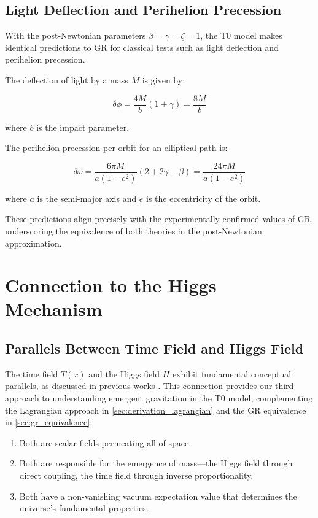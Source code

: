 \documentclass[12pt,a4paper]{article}
\newcommand{\Tfield}{T(x)}
\begin{document}
	\subsection{Light Deflection and Perihelion Precession}
	With the post-Newtonian parameters \(\beta = \gamma = \zeta = 1\), the T0 model makes identical predictions to GR for classical tests such as light deflection and perihelion precession.
	
	The deflection of light by a mass \(M\) is given by:
	
	\begin{equation}
		\delta\phi = \frac{4M}{b}(1 + \gamma) = \frac{8M}{b}
	\end{equation}
	
	where \(b\) is the impact parameter.
	
	The perihelion precession per orbit for an elliptical path is:
	
	\begin{equation}
		\delta\omega = \frac{6\pi M}{a(1-e^2)}(2 + 2\gamma - \beta) = \frac{24\pi M}{a(1-e^2)}
	\end{equation}
	
	where \(a\) is the semi-major axis and \(e\) is the eccentricity of the orbit.
	
	These predictions align precisely with the experimentally confirmed values of GR, underscoring the equivalence of both theories in the post-Newtonian approximation.
	
	\section{Connection to the Higgs Mechanism}
	\label{sec:higgs_connection}
	
	\subsection{Parallels Between Time Field and Higgs Field}
	\label{subsec:higgs_parallels}
	The time field \(\Tfield\) and the Higgs field \(H\) exhibit fundamental conceptual parallels, as discussed in previous works \cite{pascher_higgs_2025,pascher_alpha_2025,pascher_alphabeta_2025}. This connection provides our third approach to understanding emergent gravitation in the T0 model, complementing the Lagrangian approach in \cref{sec:derivation_lagrangian} and the GR equivalence in \cref{sec:gr_equivalence}:
	
	\begin{enumerate}
		\item Both are scalar fields permeating all of space.
		\item Both are responsible for the emergence of mass—the Higgs field through direct coupling, the time field through inverse proportionality.
		\item Both have a non-vanishing vacuum expectation value that determines the universe's fundamental properties.
	\end{enumerate}
	
\end{document}
